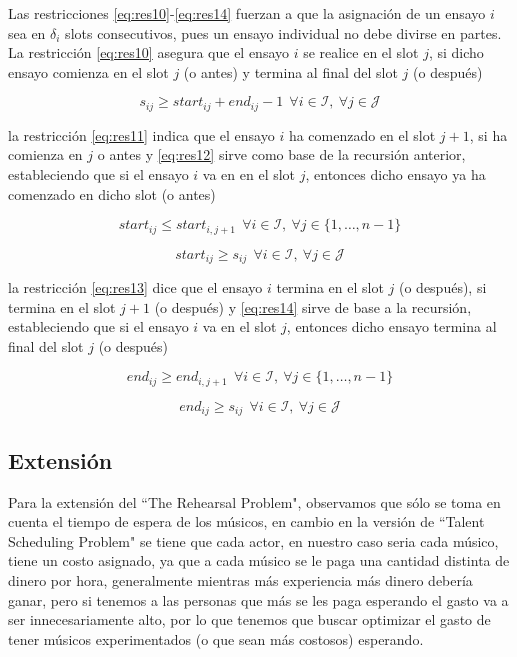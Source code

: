 \documentclass[journal, 10pt]{IEEEtran}
\begin{document}
\begin{itemize}
Las restricciones \eqref{eq:res10}-\eqref{eq:res14} fuerzan a que la asignación de un ensayo $i$ sea en $\delta_i$ slots consecutivos, pues un ensayo individual no debe divirse en partes. La restricción \eqref{eq:res10} asegura que el ensayo $i$ se realice en el slot $j$, si dicho ensayo comienza en el slot $j$ (o antes) y termina al final del slot $j$ (o después)	 

\begin{equation}\label{eq:res10} 
	s_{ij} \geq start_{ij} + end_{ij} -1 \ \ \forall i \in \mathcal{I}, \ \forall j \in \mathcal{J}
\end{equation}

la restricción \eqref{eq:res11} indica que el ensayo $i$ ha comenzado en el slot $j+1$, si ha comienza en $j$ o antes y \eqref{eq:res12} sirve como base de la recursión anterior, estableciendo que si el ensayo $i$ va en en el slot $j$, entonces dicho ensayo ya ha comenzado en dicho slot (o antes)

\begin{equation}\label{eq:res11} 
	start_{ij} \leq start_{i,j+1} \ \ \forall i \in \mathcal{I}, \ \forall j \in \{1,\ldots,n-1\}
\end{equation}  

\begin{equation}\label{eq:res12} 
	start_{ij} \geq s_{ij} \ \ \forall i \in \mathcal{I}, \ \forall j \in \mathcal{J}
\end{equation}

la restricción \eqref{eq:res13} dice que el ensayo $i$ termina en el slot $j$ (o después), si termina en el slot $j+1$ (o después) y \eqref{eq:res14} sirve de base a la recursión, estableciendo que si el ensayo $i$ va en el slot $j$, entonces dicho ensayo termina al final del slot $j$ (o después)  

\begin{equation}\label{eq:res13} 
	end_{ij} \geq end_{i,j+1} \ \ \forall i \in \mathcal{I}, \ \forall j \in \{1,\ldots,n-1\}
\end{equation} 

\begin{equation}\label{eq:res14} 
	end_{ij} \geq s_{ij} \ \ \forall i \in \mathcal{I}, \ \forall j \in \mathcal{J}
\end{equation}	

\end{itemize}  



\subsection{Extensión}
Para la extensión del ``The Rehearsal Problem", observamos que sólo se toma en cuenta el tiempo de espera de los músicos, en cambio en la versión de ``Talent Scheduling Problem" se tiene que cada actor, en nuestro caso seria cada músico, tiene un costo asignado, ya que a cada músico se le paga una cantidad distinta de dinero por hora, generalmente mientras más experiencia más dinero debería ganar, pero si tenemos a las personas que más se les paga esperando el gasto va a ser innecesariamente alto, por lo que tenemos que buscar optimizar el gasto de tener músicos experimentados (o que sean más costosos) esperando.
\end{document}
